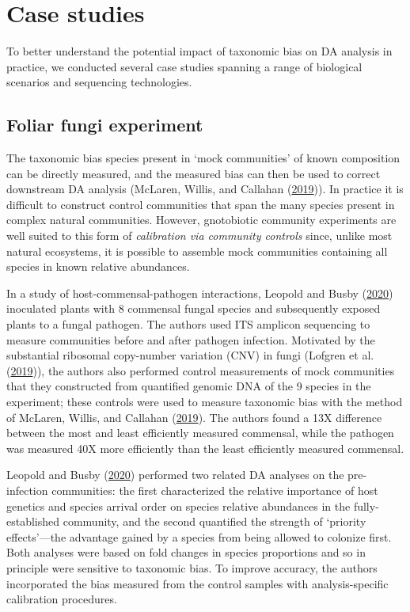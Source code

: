 \documentclass[
]{article}
\begin{document}
\hypertarget{case-studies}{%
\section{Case studies ~}\label{case-studies}}

To better understand the potential impact of taxonomic bias on DA analysis in practice, we conducted several case studies spanning a range of biological scenarios and sequencing technologies.

\hypertarget{foliar-fungi-experiment}{%
\subsection{Foliar fungi experiment}\label{foliar-fungi-experiment}}

The taxonomic bias species present in `mock communities' of known composition can be directly measured, and the measured bias can then be used to correct downstream DA analysis (McLaren, Willis, and Callahan (\protect\hyperlink{ref-mclaren2019cons}{2019})).
In practice it is difficult to construct control communities that span the many species present in complex natural communities.
However, gnotobiotic community experiments are well suited to this form of \emph{calibration via community controls} since, unlike most natural ecosystems, it is possible to assemble mock communities containing all species in known relative abundances.

In a study of host-commensal-pathogen interactions, Leopold and Busby (\protect\hyperlink{ref-leopold2020host}{2020}) inoculated plants with 8 commensal fungal species and subsequently exposed plants to a fungal pathogen.
The authors used ITS amplicon sequencing to measure communities before and after pathogen infection.
Motivated by the substantial ribosomal copy-number variation (CNV) in fungi (Lofgren et al. (\protect\hyperlink{ref-lofgren2019geno}{2019})), the authors also performed control measurements of mock communities that they constructed from quantified genomic DNA of the 9 species in the experiment; these controls were used to measure taxonomic bias with the method of McLaren, Willis, and Callahan (\protect\hyperlink{ref-mclaren2019cons}{2019}).
The authors found a 13X difference between the most and least efficiently measured commensal, while the pathogen was measured 40X more efficiently than the least efficiently measured commensal.

Leopold and Busby (\protect\hyperlink{ref-leopold2020host}{2020}) performed two related DA analyses on the pre-infection communities: the first characterized the relative importance of host genetics and species arrival order on species relative abundances in the fully-established community, and the second quantified the strength of `priority effects'---the advantage gained by a species from being allowed to colonize first.
Both analyses were based on fold changes in species proportions and so in principle were sensitive to taxonomic bias.
To improve accuracy, the authors incorporated the bias measured from the control samples with analysis-specific calibration procedures.
\end{document}
